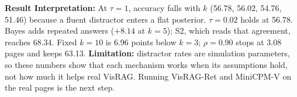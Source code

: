 \documentclass[8pt,a4paper]{article}
\begin{document}
\vspace{-6pt}
\textbf{Result Interpretation:}
At $\tau{=}1$, accuracy falls with $k$ (56.78, 56.02, 54.76, 51.46) because a fluent distractor enters a flat posterior. $\tau{=}0.02$ holds at 56.78. Bayes adds repeated answers ($+8.14$ at $k{=}5$); S2, which reads that agreement, reaches 68.34. Fixed $k{=}10$ is 6.96 points below $k{=}3$; $\rho{=}0.90$ stops at 3.08 pages and keeps 63.13. \textbf{Limitation:} distractor rates are simulation parameters, so these numbers show that each mechanism works when its assumptions hold, not how much it helps real VisRAG. Running VisRAG-Ret and MiniCPM-V on the real pages is the next step.
\end{document}
